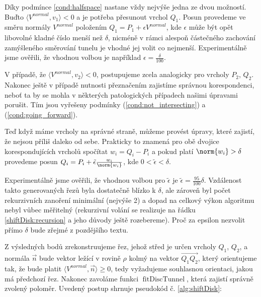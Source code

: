 Díky podmínce \ref{cond:halfspace} nastane vždy nejvýše jedna
ze dvou možností. Buďto $ {\langle V^{normal}, v_1\rangle < 0 }$ a je potřeba
přesunout vrchol $ Q_1 $. Posun provedeme ve směru normály $ V^{normal} $ položením
$ Q_1 = P_1 + \epsilon V^{normal} $, kde $ \epsilon $ může být opět libovolné
kladné číslo menší než $ \delta $, nicméně v rámci alespoň částečného zachování
zamýšleného směrování tunelu je vhodné jej volit co nejmenší. Experimentálně
jsme ověřili, že vhodnou volbou je například $ \epsilon = \frac{\delta}{100} $.

V případě, že $ \langle V^{normal}, v_2\rangle < 0 $, postupujeme zcela analogicky
pro vrcholy $ P_2 $, $ Q_2 $. Nakonec ještě v případě nutnosti přeznačením
zajistíme správnou korespondenci, neboť ta by se mohla v některých patologických
případech našimi úpravami porušit. Tím jsou vyřešeny podmínky
(\ref{cond:not_intersecting}) a (\ref{cond:going_forward}).

Teď když máme vrcholy na správné straně, můžeme provést úpravy, které zajistí,
že nejsou příliš daleko od sebe. Prakticky to znamená pro obě dvojice
korespondujících vrcholů spočítat $ w_i = Q_i - P_i $ a pokud platí
$ \norm{w_i} > \delta $ provedeme posun
$ Q_i = P_i + \tilde{\epsilon} \frac{w_i}{\norm{w_i}} $, kde
$ 0 < \tilde{\epsilon} < \delta $.

Experimentálně jsme ověřili, že vhodnou volbou pro $ \tilde{\epsilon} $ je
$ \tilde{\epsilon} = \frac{95}{100} \delta$. Vzdálenost takto generovaných řezů
byla dostatečně blízko k $ \delta $, ale zároveň byl počet rekurzivních zanoření
minimální (nejvýše 2) a dopad na celkový výkon algoritmu nebyl vůbec měřitelný
(rekurzivní volání se realizuje na řádku \ref{shiftDisk:recursion} a jeho důvody
ještě rozebereme). Proč za epsilon nezvolit přímo $ \delta $ bude zřejmé z
pozdějšího textu.

Z výsledných bodů zrekonstruujeme řez, jehož střed je určen vrcholy
$ Q_1 $, $ Q_2 $, a normála $ \vec{n} $ bude vektor ležící v rovině $ \rho $
kolmý na vektor $ \overrightarrow{Q_1 Q_2} $, který orientujeme tak, že bude platit
$ \langle V^{normal}, \vec{n} \rangle \geq 0 $, tedy vyžadujeme souhlasnou
orientaci, jakou má předchozí řez. Nakonec zavoláme funkci
$ \operatorname{fitDiscTunnel} $, která zajistí správně zvolený poloměr.
Uvedený postup shrnuje pseudokód č. \ref{alg:shiftDisk}:


